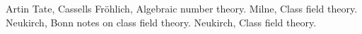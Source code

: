 %







\begin{thebibliography}{50}
	Artin Tate,
	Cassells Fr\"ohlich,
	Algebraic number theory.
  Milne,
  Class field theory.
	Neukirch,
	Bonn notes on class field theory.
  Neukirch,
  Class field theory.

\end{thebibliography}
